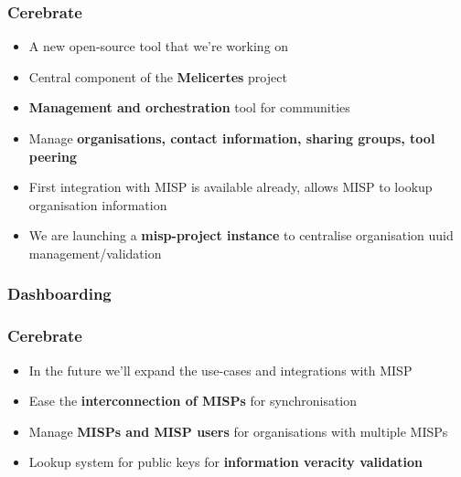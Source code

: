 \begin{frame}
\frametitle{Cerebrate}
\begin{itemize}
	\item A new open-source tool that we're working on
        \item Central component of the {\bf Melicertes} project
        \item {\bf Management and orchestration} tool for communities
        \item Manage {\bf organisations, contact information, sharing groups, tool peering}
        \item First integration with MISP is available already, allows MISP to lookup organisation information
        \item We are launching a {\bf misp-project instance} to centralise organisation uuid management/validation
\end{itemize}
\end{frame}

\begin{frame}
\frametitle{Dashboarding}
\noindent{}
\noindent{}
\end{frame}

\begin{frame}
\frametitle{Cerebrate}
\begin{itemize}
	\item In the future we'll expand the use-cases and integrations with MISP
        \item Ease the {\bf interconnection of MISPs} for synchronisation
        \item Manage {\bf MISPs and MISP users} for organisations with multiple MISPs
        \item Lookup system for public keys for {\bf information veracity validation}
\end{itemize}
\end{frame}


